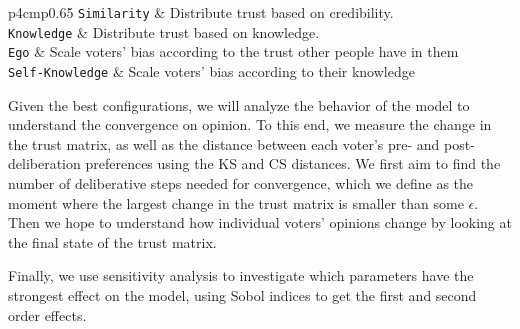 \begin{table}
\begin{tabular}{p{4cm}p{0.65\linewidth }}
		\texttt{Similarity}           & Distribute trust based on credibility.                                                                                                                                      \\
		\texttt{Knowledge}            & Distribute trust based on knowledge.                                                                                                                                        \\
		\texttt{Ego}                  & Scale voters' bias according to the trust other people have in them                                                                                                         \\
		\texttt{Self-Knowledge}       & Scale voters' bias according to their knowledge                                                                                                                             \\
		\bottomrule
	\end{tabular}
	\caption{The parameters of the DeGroot learning based model, as well as their descriptions}
\end{table}

Given the best configurations, we will analyze the behavior of the model to
understand the convergence on opinion. To this end, we measure the change in the trust
matrix, as well as the distance between each voter's pre- and post-deliberation
preferences using the KS and CS distances. We first aim to find the number of
deliberative steps needed for convergence, which we define as the moment where
the largest change in the trust matrix is smaller than some $\epsilon$. Then we
hope to understand how individual voters' opinions change by looking at the
final state of the trust matrix.

Finally, we use sensitivity analysis to investigate which parameters have the
strongest effect on the model, using Sobol indices to get the first and second
order effects.

